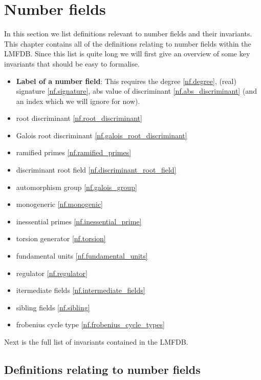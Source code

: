 \newpage



\chapter{Number fields}

In this section we list definitions relevant to number fields and their invariants. This chapter
contains all of the definitions relating to number fields within the LMFDB. Since this list is quite long
we will first give an overview of some key invariants that should be easy to formalise.


\begin{itemize}
    \item \textbf{Label of a number field}: This requires the degree \ref{nf.degree}, (real) signature \ref{nf.signature},
     abs value of discriminant \ref{nf.abs_discriminant} (and an index which we will ignore for now).
    \item root discriminant \ref{nf.root_discriminant}
    \item Galois root discriminant \ref{nf.galois_root_discriminant}
    \item ramified primes \ref{nf.ramified_primes}
    \item discriminant root field \ref{nf.discriminant_root_field}
    \item automorphism group \ref{nf.galois_group}
    \item monogeneric \ref{nf.monogenic}
    \item inessential primes \ref{nf.inessential_prime}
    \item torsion generator \ref{nf.torsion}
    \item fundamental units \ref{nf.fundamental_units}
    \item regulator \ref{nf.regulator}
    \item itermediate fields \ref{nf.intermediate_fields}
    \item sibling fields \ref{nf.sibling}
    \item frobenius cycle type \ref{nf.frobenius_cycle_types}
    \end{itemize}

Next is the full list of invariants contained in the LMFDB.


\section{Definitions relating to number fields}

